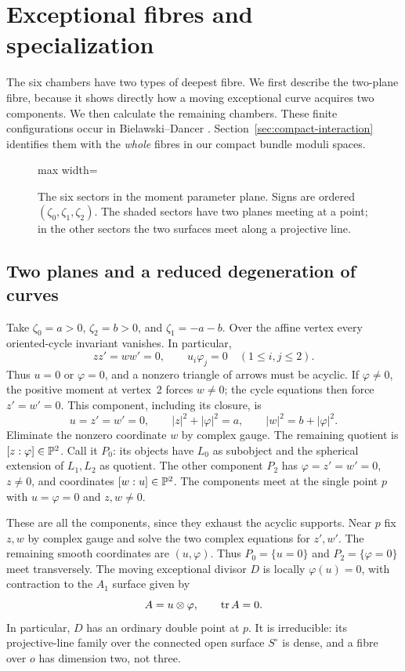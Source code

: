 \section{Exceptional fibres and specialization}\label{sec:chambers}

The six chambers have two types of deepest fibre. We first
describe the two-plane fibre, because it shows directly how a
moving exceptional curve acquires two components. We then
calculate the remaining chambers. These finite configurations
occur in Bielawski--Dancer \cite[Example~6.10]{bielawskidancer}.
Section~\ref{sec:compact-interaction} identifies them with the
\emph{whole} fibres in our compact bundle moduli spaces.

\begin{figure}[tb]
\centering
\begin{adjustbox}{max width=\textwidth}

\end{adjustbox}
\caption{The six sectors in the moment parameter plane. Signs are
ordered $(\zeta_0,\zeta_1,\zeta_2)$. The shaded sectors have
two planes meeting at a point; in the other sectors the two
surfaces meet along a projective line.}
\label{fig:chambers}
\end{figure}

\subsection{Two planes and a reduced degeneration of curves}
Take $\zeta_0=a>0$, $\zeta_2=b>0$, and $\zeta_1=-a-b$.
Over the affine vertex every oriented-cycle invariant vanishes.
In particular,
\[
 zz'=ww'=0,\qquad u_i\varphi_j=0\quad(1\le i,j\le2).
\]
Thus $u=0$ or $\varphi=0$, and a nonzero triangle of
arrows must be acyclic. If $\varphi\ne0$, the positive
moment at vertex~2 forces $w\ne0$; the cycle equations
then force $z'=w'=0$. This component, including its
closure, is
\begin{equation}\label{eq:plane-zero-section}
 u=z'=w'=0,\qquad |z|^2+|\varphi|^2=a,\qquad
 |w|^2=b+|\varphi|^2.
\end{equation}
Eliminate the nonzero coordinate $w$ by complex gauge.
The remaining quotient is $[z:\varphi]\in\mathbb P^2$.
Call it $P_0$: its objects have $L_0$ as subobject
and the spherical extension of $L_1,L_2$ as quotient.
The other component $P_2$ has $\varphi=z'=w'=0$,
$z\ne0$, and coordinates $[w:u]\in\mathbb P^2$.
The components meet at the single point $p$ with
$u=\varphi=0$ and $z,w\ne0$.

These are all the components, since they exhaust the
acyclic supports. Near $p$ fix $z,w$ by complex gauge
and solve the two complex equations for $z',w'$.
The remaining smooth coordinates are $(u,\varphi)$.
Thus $P_0=\{u=0\}$ and $P_2=\{\varphi=0\}$ meet
transversely. The moving exceptional divisor $D$ is
locally $\varphi(u)=0$, with contraction to the
$A_1$ surface given by
\[
 A=u\otimes\varphi,\qquad \operatorname{tr} A=0.
\]
In particular, $D$ has an ordinary double point at $p$.
It is irreducible: its projective-line family over the
connected open surface $S^\circ$ is dense, and a
fibre over $o$ has dimension two, not three.

